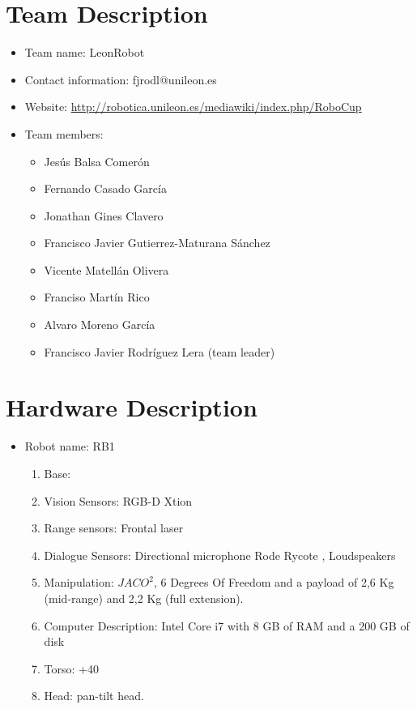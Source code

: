 \documentclass[citeauthoryear]{llncs}
\begin{document}
\section{Team Description}

\begin{itemize}
  \item Team name: LeonRobot
  \item Contact information: fjrodl@unileon.es
  \item Website: \url{http://robotica.unileon.es/mediawiki/index.php/RoboCup}
  \item Team members:
      \begin{itemize}
	\item Jes\'us Balsa Comer\'on
	\item Fernando Casado Garc\'ia 
	\item Jonathan Gines Clavero 
	\item Francisco Javier Gutierrez-Maturana S\'anchez
	
	\item Vicente Matell\'an Olivera
	\item Franciso Mart\'in Rico 
	\item Alvaro Moreno Garc\'ia 
	\item Francisco Javier Rodr\'iguez Lera (team leader)
      \end{itemize}
\end{itemize}

\section{Hardware Description}

\begin{itemize}

  \item Robot name: RB1
  \begin{enumerate}
    \item Base:
    
    \item Vision Sensors: RGB-D Xtion
    \item Range sensors: Frontal laser 
    \item Dialogue Sensors: Directional microphone Rode Rycote , Loudspeakers
    \item Manipulation: $JACO^2$, 6 Degrees Of Freedom and a payload of 2,6 Kg (mid-range) and 2,2 Kg (full extension).
    \item Computer Description: Intel Core i7 with 8 GB of RAM and a 200 GB of disk
    \item Torso: +40
    \item Head: pan-tilt head.
  \end{enumerate}

\end{itemize}
\end{document}
